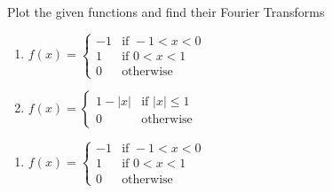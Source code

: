 \item Plot the given functions and find their Fourier Transforms
%
\begin{enumerate}
  \item
  $\displaystyle
  f(x) =
  \begin{cases}
    -1 & \text{if } -1 < x < 0\\
    1 &  \text{if } 0 < x < 1\\
    0 & \text{otherwise}
  \end{cases}
  $
  \item
  $\displaystyle
  f(x) =
  \begin{cases}
    1 - |x| & \text{if } |x| \leq 1\\
    0 & \text{otherwise}
  \end{cases}
  $
\end{enumerate}

\begin{enumerate}
  \item
  $\displaystyle
  f(x) =
  \begin{cases}
    -1 & \text{if } -1 < x < 0\\
    1 &  \text{if } 0 < x < 1\\
    0 & \text{otherwise}
  \end{cases}
  $
\end{enumerate}
